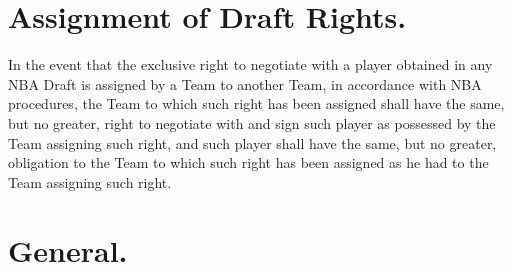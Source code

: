 \documentclass[
]{book}
\begin{document}
\hypertarget{assignment-of-draft-rights.}{%
\section{Assignment of Draft Rights.}\label{assignment-of-draft-rights.}}

In the event that the exclusive right to negotiate with a player obtained in any NBA Draft is assigned by a Team to another Team, in accordance with NBA procedures, the Team to which such right has been assigned shall have the same, but no greater, right to negotiate with and sign such player as possessed by the Team assigning such right, and such player shall have the same, but no greater, obligation to the Team to which such right has been assigned as he had to the Team assigning such right.

\hypertarget{general.-2}{%
\section{General.}\label{general.-2}}
\end{document}
